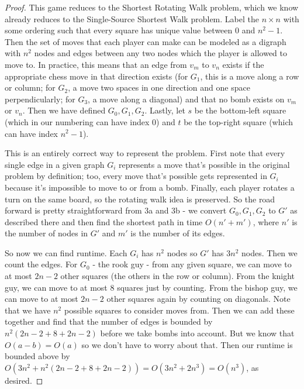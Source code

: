 \documentclass[11pt]{article}
\begin{document}
\begin{enumerate}
\begin{enumerate}
\begin{proof}
This game reduces to the Shortest Rotating Walk problem, which we know already reduces to the Single-Source Shortest Walk problem. Label the $n \times n$ with some ordering such that every square has unique value between $0$ and $n^2 - 1$. Then the set of moves that each player can make can be modeled as a digraph with $n^2$ nodes and edges between any two nodes which the player is allowed to move to. In practice, this means that an edge from $v_m$ to $v_n$ exists if the appropriate chess move in that direction exists (for $G_1$, this is a move along a row or column; for $G_2$, a move two spaces in one direction and one space perpendicularly; for $G_3$, a move along a diagonal) and that no bomb exists on $v_m$ or $v_n$. Then we have defined $G_0, G_1, G_2$. Lastly, let $s$ be the bottom-left square (which in our numbering can have index 0) and $t$ be the top-right square (which can have index $n^2 - 1$).

This is an entirely correct way to represent the problem. First note that every single edge in a given graph $G_i$ represents a move that's possible in the original problem by definition; too, every move that's possible gets represented in $G_i$ because it's impossible to move to or from a bomb. Finally, each player rotates a turn on the same board, so the rotating walk idea is preserved. So the road forward is pretty straightforward from 3a and 3b - we convert $G_0, G_1, G_2$ to $G'$ as described there and then find the shortest path in time $O(n' + m')$, where $n'$ is the number of nodes in $G'$ and $m'$ is the number of its edges.

So now we can find runtime. Each $G_i$ has $n^2$ nodes so $G'$ has $3n^2$ nodes. Then we count the edges. For $G_0$ - the rook guy - from any given square, we can move to at most $2n - 2$ other squares (the others in the row or column). From the knight guy, we can move to at most $8$ squares just by counting. From the bishop guy, we can move to at most $2n - 2$ other squares again by counting on diagonals. Note that we have $n^2$ possible squares to consider moves from. Then we can add these together and find that the number of edges is bounded by $n^2 (2n - 2 + 8 + 2n - 2)$ before we take bombs into account. But we know that $O(a - b) = O(a)$ so we don't have to worry about that. Then our runtime is bounded above by $O(3n^2 + n^2 (2n - 2 + 8 + 2n - 2)) = O(3n^2 + 2n^3) = O(n^3)$, as desired.
\end{proof}

    \end{enumerate}
\end{enumerate}
\end{document}
